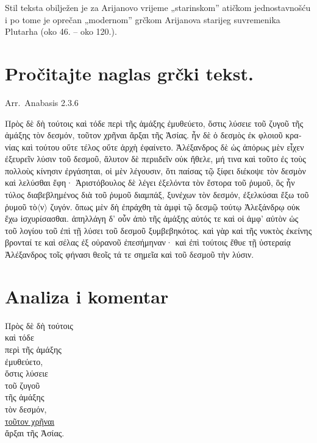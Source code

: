 Stil teksta obilježen je za Arijanovo vrijeme „starinskom'' atičkom jednostavnošću i po tome je oprečan „modernom'' grčkom Arijanova starijeg suvremenika Plutarha (oko 46. – oko 120.).


\section*{Pročitajte naglas grčki tekst.}


Arr.\ Anabasis 2.3.6

\medskip

{\large
\begin{greek}
\noindent Πρὸς δὲ δὴ τούτοις καὶ τόδε περὶ τῆς ἁμάξης ἐμυθεύετο, ὅστις λύσειε τοῦ ζυγοῦ τῆς ἁμάξης τὸν δεσμόν, τοῦτον χρῆναι ἄρξαι τῆς Ἀσίας. ἦν δὲ ὁ δεσμὸς ἐκ φλοιοῦ κρανίας καὶ τούτου οὔτε τέλος οὔτε ἀρχὴ ἐφαίνετο. Ἀλέξανδρος δὲ ὡς ἀπόρως μὲν εἶχεν ἐξευρεῖν λύσιν τοῦ δεσμοῦ, ἄλυτον δὲ περιιδεῖν οὐκ ἤθελε, μή τινα καὶ τοῦτο ἐς τοὺς πολλοὺς κίνησιν ἐργάσηται, οἱ μὲν λέγουσιν, ὅτι παίσας τῷ ξίφει διέκοψε τὸν δεσμὸν καὶ λελύσθαι ἔφη· Ἀριστόβουλος δὲ λέγει ἐξελόντα τὸν ἕστορα τοῦ ῥυμοῦ, ὃς ἦν τύλος διαβεβλημένος διὰ τοῦ ῥυμοῦ διαμπάξ, ξυνέχων τὸν δεσμόν, ἐξελκύσαι ἔξω τοῦ ῥυμοῦ τὸ$\langle$ν$\rangle$ ζυγόν. ὅπως μὲν δὴ ἐπράχθη τὰ ἀμφὶ τῷ δεσμῷ τούτῳ Ἀλεξάνδρῳ οὐκ ἔχω ἰσχυρίσασθαι. ἀπηλλάγη  δ' οὖν ἀπὸ τῆς ἁμάξης αὐτός τε καὶ οἱ ἀμφ' αὐτὸν ὡς τοῦ λογίου τοῦ ἐπὶ τῇ λύσει τοῦ δεσμοῦ ξυμβεβηκότος. καὶ γὰρ καὶ τῆς νυκτὸς ἐκείνης βρονταί τε καὶ σέλας ἐξ οὐρανοῦ ἐπεσήμηναν· καὶ ἐπὶ τούτοις ἔθυε τῇ ὑστεραίᾳ Ἀλέξανδρος τοῖς φήνασι θεοῖς τά τε σημεῖα καὶ τοῦ δεσμοῦ τὴν λύσιν.
\end{greek}

}



\section*{Analiza i komentar}



{\large
\noindent Πρὸς δὲ δὴ τούτοις \\
καὶ τόδε \\
\tabto{2em} περὶ τῆς ἁμάξης \\
ἐμυθεύετο, \\
\tabto{2em} ὅστις λύσειε \\
\tabto{4em} τοῦ ζυγοῦ\\
\tabto{6em} τῆς ἁμάξης \\
\tabto{2em} τὸν δεσμόν, \\
\underline{τοῦτον χρῆναι} \\
\tabto{2em} ἄρξαι τῆς Ἀσίας.\\

}

